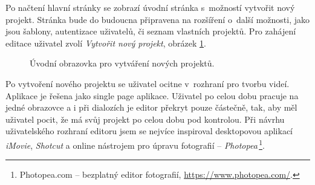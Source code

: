 Po načtení hlavní stránky se zobrazí úvodní stránka s~možností vytvořit nový projekt. Stránka bude do budoucna připravena na rozšíření o~další možnosti, jako jsou šablony, autentizace uživatelů, či seznam vlastních projektů. Pro zahájení editace uživatel zvolí \textit{Vytvořit nový projekt}, obrázek \ref{img:novy-projekt}.
\begin{figure}[h]
	\centering
	\caption{Úvodní obrazovka pro vytváření nových projektů.}\label{img:novy-projekt}
\end{figure}

Po vytvoření nového projektu se uživatel ocitne v~rozhraní pro tvorbu videí. Aplikace je řešena jako single page aplikace. Uživatel po celou dobu pracuje na jedné obrazovce a i při dialozích je editor překryt pouze částečně, tak, aby měl uživatel pocit, že má svůj projekt po celou dobu pod kontrolou. Při návrhu uživatelského rozhraní editoru jsem se nejvíce inspiroval desktopovou aplikací \textit{iMovie}, \textit{Shotcut} a online nástrojem pro úpravu fotografií -- \textit{Photopea}\,\footnote{Photopea.com -- bezplatný editor fotografií, \url{https://www.photopea.com/}.}.

